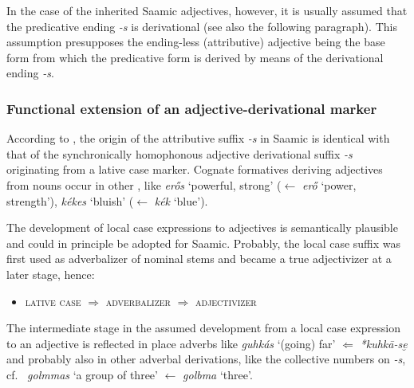 {In the case of the inherited Saamic adjectives, however, it is usually assumed that the predicative ending \textit{-s} is derivational (see also the following paragraph). This assumption presupposes the ending-less (attributive) adjective being the base form from which the predicative form is derived by means of the derivational ending \textit{-s}. %

\subsubsection{Functional extension of an adjective-derivational marker}
According to \citet[96]{bergsland1946}, the origin of the attributive suffix \textit{-s} in Saamic is identical with that of the synchronically homophonous adjective derivational suffix \textit{-s} originating from a lative case marker. Cognate formatives deriving adjectives from nouns occur in other , like  \textit{erős} ‘powerful, strong’ ($\leftarrow$ \textit{erő} ‘power, strength’), \textit{kékes} ‘bluish’ ($\leftarrow$ \textit{kék} ‘blue’).

The development of local case expressions to adjectives is semantically plausible and could in principle be adopted for Saamic. Probably, the local case suffix was first used as adverbalizer of nominal stems and became a true adjectivizer at a later stage, hence:
\begin{itemize}
\item \textsc{lative case} $\Rightarrow$ \textsc{adverbalizer} $\Rightarrow$ \textsc{adjectivizer}
\end{itemize}

The intermediate stage in the assumed development from a local case expression to an adjective is reflected in place adverbs like  \textit{guhkás} ‘(going) far’ $\Leftarrow$  \textit{*kuhkā-se̮} \citep[246]{sammallahti1998b} and probably also in other adverbal derivations, like the collective numbers on \textit{-s}, cf.~ \textit{golmmas} ‘a group of three’ $\leftarrow$ \textit{golbma} ‘three’.

}
